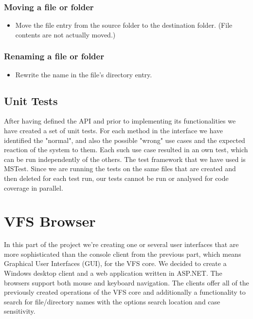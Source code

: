\documentclass[a4paper,12pt]{article}
\begin{document}
\subsubsection{Moving a file or folder}\label{moving-a-file-or-folder}
    \begin{itemize}
        \itemsep1pt\parskip0pt
        \item{Move the file entry from the source folder to the destination folder. (File contents are not actually moved.)}
    \end{itemize}

\subsubsection{Renaming a file or folder}\label{renaming-a-file-or-folder}
    \begin{itemize}
        \itemsep1pt\parskip0pt
        \item{Rewrite the name in the file's directory entry.}
    \end{itemize}

\subsection{Unit Tests}
After having defined the API and prior to implementing its functionalities we have created a set of unit tests. For each method in the interface we have identified the "normal", and also the possible "wrong" use cases and the expected reaction of the system to them. Each such use case resulted in an own test, which can be run independently of the others. The test framework that we have used is MSTest.\newline
Since we are running the tests on the same files that are created and then deleted for each test run, our tests cannot be run or analysed for code coverage in parallel.




\section{VFS Browser}
In this part of the project we're creating one or several user interfaces that are more sophisticated than the console client from the previous part, which means Graphical User Interfaces (GUI), for the VFS core. We decided to create a Windows desktop client and a web application written in ASP.NET. The browsers support both mouse and keyboard navigation. \newline
The clients offer all of the previously created operations of the VFS core and additionally a functionality to search for file/directory names with the options search location and case sensitivity.
\end{document}
